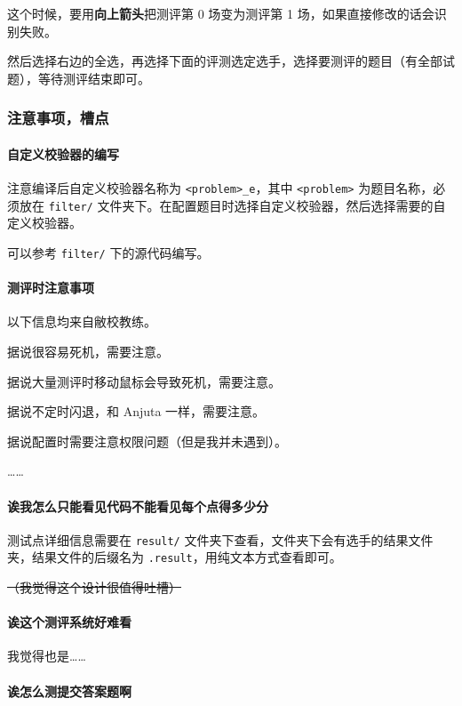 这个时候，要用\textbf{向上箭头}把测评第 0 场变为测评第 1 场，如果直接修改的话会识别失败。

然后选择右边的全选，再选择下面的评测选定选手，选择要测评的题目（有全部试题），等待测评结束即可。

\subsubsection{注意事项，槽点}

\paragraph{自定义校验器的编写}

注意编译后自定义校验器名称为 \texttt{<problem>_e}，其中 \texttt{<problem>} 为题目名称，必须放在 \texttt{filter/} 文件夹下。在配置题目时选择自定义校验器，然后选择需要的自定义校验器。

可以参考 \texttt{filter/} 下的源代码编写。

\paragraph{测评时注意事项}

以下信息均来自敝校教练。

据说很容易死机，需要注意。

据说大量测评时移动鼠标会导致死机，需要注意。

据说不定时闪退，和 Anjuta 一样，需要注意。

据说配置时需要注意权限问题（但是我并未遇到）。

……

\paragraph{诶我怎么只能看见代码不能看见每个点得多少分}

测试点详细信息需要在 \texttt{result/} 文件夹下查看，文件夹下会有选手的结果文件夹，结果文件的后缀名为 \texttt{.result}，用纯文本方式查看即可。

\st{（我觉得这个设计很值得吐槽）}

\paragraph{诶这个测评系统好难看}

我觉得也是……

\paragraph{诶怎么测提交答案题啊}

